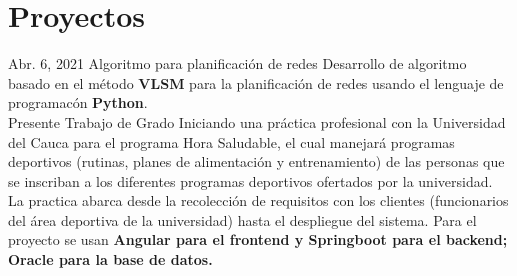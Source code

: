 \documentclass[american]{cv-class}
\begin{document}
	\section{Proyectos}
    \begin{entrylist}
    \entry
    	{Abr. 6, 2021}
    	{Algoritmo para planificación de redes}
    	{ }
    	{\justifying Desarrollo de algoritmo basado en el método \textbf{VLSM} 
    	para la planificación de redes usando el lenguaje de programacón \textbf{Python}.}
    \\
    \entry
    	{Presente}
    	{Trabajo de Grado}
    	{ }
    	{\justifying Iniciando una práctica profesional con la Universidad del Cauca para el programa Hora Saludable, el cual manejará programas deportivos (rutinas, planes de alimentación y entrenamiento) de las personas que se inscriban a los diferentes programas deportivos ofertados por la universidad. La practica abarca desde la recolección de requisitos con los clientes (funcionarios del área deportiva de la universidad) hasta el despliegue del sistema. Para el proyecto se usan \textbf{Angular para el frontend y Springboot para el backend; Oracle para la base de datos.}}
    	
    \end{entrylist}
\end{document}
